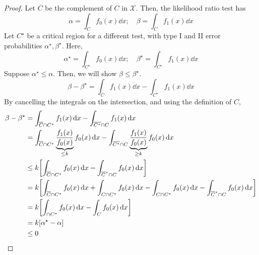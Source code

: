 \begin{proof}
	Let \( \overline C \) be the complement of \( C \) in \( \mathcal X \).
	Then, the likelihood ratio test has
	\[ \alpha = \int_C f_0(x) \dd{x};\quad \beta = \int_{\overline C} f_1(x) \dd{x} \]
	Let \( C^\star \) be a critical region for a different test, with type I and II error probabilities \( \alpha^\star, \beta^\star \).
	Here,
	\[ \alpha^\star = \int_{C^\star} f_0(x) \dd{x};\quad \beta^\star = \int_{\overline {C^\star}} f_1(x) \dd{x} \]
	Suppose \( \alpha^\star \leq \alpha \).
	Then, we will show \( \beta \leq \beta^\star \).
	\[ \beta - \beta^\star = \int_{\overline C} f_1(x) \dd{x} - \int_{\overline{C^\star}} f_1(x) \dd{x} \]
	By cancelling the integrals on the intersection, and using the definition of \( C \),
	\begin{align*}
		\beta - \beta^\star &= \int_{\overline C \cap C^\star} f_1(x) \dd{x} - \int_{\overline{C^\star} \cap C} f_1(x) \dd{x} \\
		&= \int_{\overline C \cap C^\star} \underbrace{\frac{f_1(x)}{f_0(x)}}_{\leq k} f_0(x) \dd{x} - \int_{\overline{C^\star} \cap C} \underbrace{\frac{f_1(x)}{f_0(x)}}_{\geq k} f_0(x) \dd{x} \\
		&\leq k \qty[ \int_{\overline C \cap C^\star} f_0(x) \dd{x} - \int_{\overline C^\star \cap C} f_0(x) \dd{x} ] \\
		&= k \qty[ \int_{\overline C \cap C^\star} f_0(x) \dd{x} + \int_{C \cap C^\star} f_0(x) \dd{x} - \int_{C \cap C^\star} f_0(x) \dd{x} - \int_{\overline C^\star \cap C} f_0(x) \dd{x} ] \\
		&= k \qty[ \int_{\cap C^\star} f_0(x) \dd{x} - \int_{C} f_0(x) \dd{x} ] \\
		&= k \qty[ \alpha^\star - \alpha ] \\
		&\leq 0
	\end{align*}
\end{proof}
